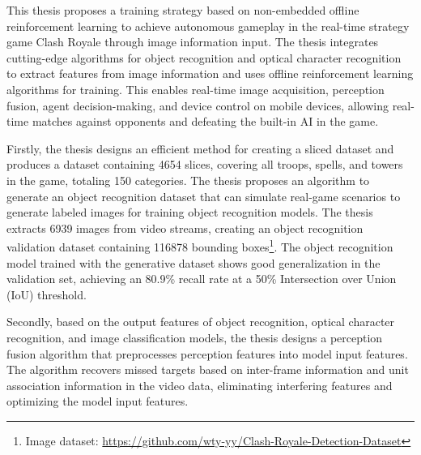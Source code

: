 \clearpage
\setcounter{footnote}{0}

\titlespacing{\chapter}{0pt}{0mm}{5mm}

\noindent This thesis proposes a training strategy based on non-embedded offline reinforcement learning to achieve autonomous gameplay in the real-time strategy game Clash Royale through image information input.
The thesis integrates cutting-edge algorithms for object recognition and optical character recognition to extract features from image information and uses offline reinforcement learning algorithms for training.
This enables real-time image acquisition, perception fusion, agent decision-making, and device control on mobile devices, allowing real-time matches against opponents and defeating the built-in AI in the game.

\noindent Firstly, the thesis designs an efficient method for creating a sliced dataset and produces a dataset containing 4654 slices, covering all troops, spells, and towers in the game, totaling 150 categories. The thesis proposes an algorithm to generate an object recognition dataset that can simulate real-game scenarios to
generate labeled images for training object recognition models. The thesis extracts 6939 images from video streams, creating an object recognition validation dataset containing 116878 bounding boxes\footnote{Image dataset: \url{https://github.com/wty-yy/Clash-Royale-Detection-Dataset}\hfill}. The object recognition model trained with the generative dataset shows good generalization in the validation set, achieving an 80.9\% recall rate at a 50\% Intersection over Union (IoU) threshold.

\noindent Secondly, based on the output features of object recognition, optical character recognition, and image classification models, the thesis designs a perception fusion algorithm that preprocesses perception features into model input features. The algorithm recovers missed targets based on inter-frame information and unit association information in the video data, eliminating interfering features and optimizing the model input features.

